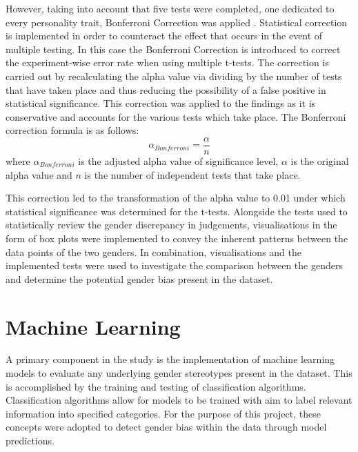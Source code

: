 \documentclass{l4proj}
\begin{document}
However, taking into account that five tests were completed, one dedicated to every personality trait, Bonferroni Correction was applied \citep{napierala2012bonferroni}. Statistical correction is implemented in order to counteract the effect that occurs in the event of multiple testing. In this case the Bonferroni Correction is introduced to correct the experiment-wise error rate when using multiple t-tests. The correction is carried out by recalculating the alpha value via dividing by the number of tests that have taken place and thus reducing the possibility of a false positive in statistical significance. This correction was applied to the findings as it is conservative and accounts for the various tests which take place. The Bonferroni correction formula is as follows:
\begin{equation}
\alpha_{Bonferroni} = \frac{\alpha}{n}
\end{equation}
where $\alpha_{Bonferroni}$ is the adjusted alpha value of significance level, $\alpha$ is the original alpha value and $n$ is the number of independent tests that take place.

This correction led to the transformation of the alpha value to 0.01 under which statistical significance was determined for the t-tests.
Alongside the tests used to statistically review the gender discrepancy in judgements, visualisations in the form of box plots were implemented to convey the inherent patterns between the data points of the two genders.
In combination, visualisations and the implemented tests were used to investigate the comparison between the genders and determine the potential gender bias present in the dataset.

\section{Machine Learning}\label{sec:Implementation_ML}
A primary component in the study is the implementation of machine learning models to evaluate any underlying gender stereotypes present in the dataset. This is accomplished by the training and testing of classification algorithms.
Classification algorithms allow for models to be trained with aim to label relevant information into specified categories. For the purpose of this project, these concepts were adopted to detect gender bias within the data through model predictions.
\end{document}

